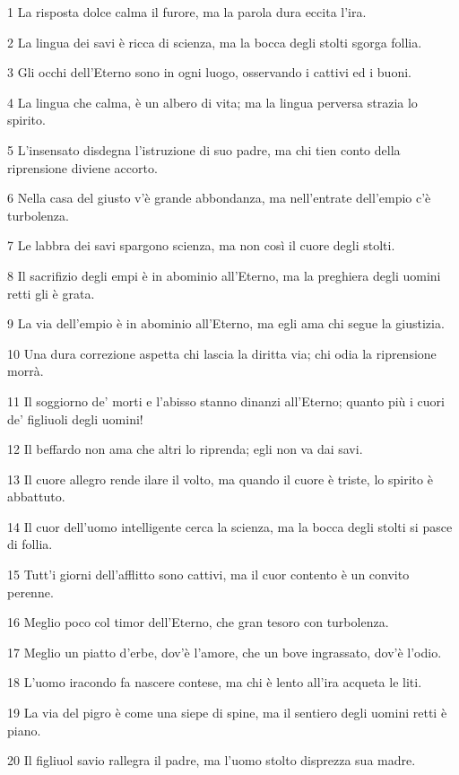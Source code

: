 \par 1 La risposta dolce calma il furore, ma la parola dura eccita l'ira.
\par 2 La lingua dei savi è ricca di scienza, ma la bocca degli stolti sgorga follia.
\par 3 Gli occhi dell'Eterno sono in ogni luogo, osservando i cattivi ed i buoni.
\par 4 La lingua che calma, è un albero di vita; ma la lingua perversa strazia lo spirito.
\par 5 L'insensato disdegna l'istruzione di suo padre, ma chi tien conto della riprensione diviene accorto.
\par 6 Nella casa del giusto v'è grande abbondanza, ma nell'entrate dell'empio c'è turbolenza.
\par 7 Le labbra dei savi spargono scienza, ma non così il cuore degli stolti.
\par 8 Il sacrifizio degli empi è in abominio all'Eterno, ma la preghiera degli uomini retti gli è grata.
\par 9 La via dell'empio è in abominio all'Eterno, ma egli ama chi segue la giustizia.
\par 10 Una dura correzione aspetta chi lascia la diritta via; chi odia la riprensione morrà.
\par 11 Il soggiorno de' morti e l'abisso stanno dinanzi all'Eterno; quanto più i cuori de' figliuoli degli uomini!
\par 12 Il beffardo non ama che altri lo riprenda; egli non va dai savi.
\par 13 Il cuore allegro rende ilare il volto, ma quando il cuore è triste, lo spirito è abbattuto.
\par 14 Il cuor dell'uomo intelligente cerca la scienza, ma la bocca degli stolti si pasce di follia.
\par 15 Tutt'i giorni dell'afflitto sono cattivi, ma il cuor contento è un convito perenne.
\par 16 Meglio poco col timor dell'Eterno, che gran tesoro con turbolenza.
\par 17 Meglio un piatto d'erbe, dov'è l'amore, che un bove ingrassato, dov'è l'odio.
\par 18 L'uomo iracondo fa nascere contese, ma chi è lento all'ira acqueta le liti.
\par 19 La via del pigro è come una siepe di spine, ma il sentiero degli uomini retti è piano.
\par 20 Il figliuol savio rallegra il padre, ma l'uomo stolto disprezza sua madre.
